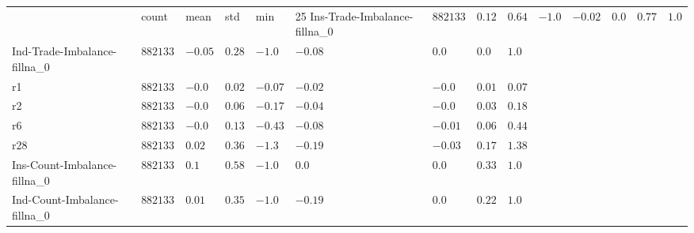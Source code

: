 \begin{tabular}{lllllllll}
    \toprule
                                 & count               & mean               & std               & min                & 25                                                                              %
    \midrule
    Ins-Trade-Imbalance-fillna_0 & \(\mathrm{882133}\) & \(\mathrm{0.12}\)  & \(\mathrm{0.64}\) & \(\mathrm{-1.0}\)  & \(\mathrm{-0.02}\) & \(\mathrm{0.0}\)   & \(\mathrm{0.77}\) & \(\mathrm{1.0}\)  \\
    Ind-Trade-Imbalance-fillna_0 & \(\mathrm{882133}\) & \(\mathrm{-0.05}\) & \(\mathrm{0.28}\) & \(\mathrm{-1.0}\)  & \(\mathrm{-0.08}\) & \(\mathrm{0.0}\)   & \(\mathrm{0.0}\)  & \(\mathrm{1.0}\)  \\
    r1                           & \(\mathrm{882133}\) & \(\mathrm{-0.0}\)  & \(\mathrm{0.02}\) & \(\mathrm{-0.07}\) & \(\mathrm{-0.02}\) & \(\mathrm{-0.0}\)  & \(\mathrm{0.01}\) & \(\mathrm{0.07}\) \\
    r2                           & \(\mathrm{882133}\) & \(\mathrm{-0.0}\)  & \(\mathrm{0.06}\) & \(\mathrm{-0.17}\) & \(\mathrm{-0.04}\) & \(\mathrm{-0.0}\)  & \(\mathrm{0.03}\) & \(\mathrm{0.18}\) \\
    r6                           & \(\mathrm{882133}\) & \(\mathrm{-0.0}\)  & \(\mathrm{0.13}\) & \(\mathrm{-0.43}\) & \(\mathrm{-0.08}\) & \(\mathrm{-0.01}\) & \(\mathrm{0.06}\) & \(\mathrm{0.44}\) \\
    r28                          & \(\mathrm{882133}\) & \(\mathrm{0.02}\)  & \(\mathrm{0.36}\) & \(\mathrm{-1.3}\)  & \(\mathrm{-0.19}\) & \(\mathrm{-0.03}\) & \(\mathrm{0.17}\) & \(\mathrm{1.38}\) \\
    Ins-Count-Imbalance-fillna_0 & \(\mathrm{882133}\) & \(\mathrm{0.1}\)   & \(\mathrm{0.58}\) & \(\mathrm{-1.0}\)  & \(\mathrm{0.0}\)   & \(\mathrm{0.0}\)   & \(\mathrm{0.33}\) & \(\mathrm{1.0}\)  \\
    Ind-Count-Imbalance-fillna_0 & \(\mathrm{882133}\) & \(\mathrm{0.01}\)  & \(\mathrm{0.35}\) & \(\mathrm{-1.0}\)  & \(\mathrm{-0.19}\) & \(\mathrm{0.0}\)   & \(\mathrm{0.22}\) & \(\mathrm{1.0}\)  \\
    \bottomrule
\end{tabular}
